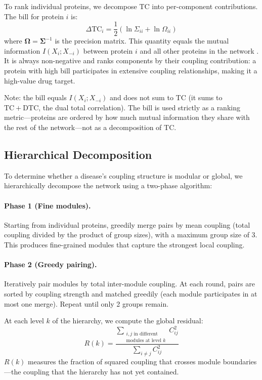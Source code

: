 \documentclass[11pt,a4paper]{article}
\begin{document}
To rank individual proteins, we decompose TC into per-component contributions. The bill for protein $i$ is:
\begin{equation}
\Delta\mathrm{TC}_i = \frac{1}{2}\left(\ln \Sigma_{ii} + \ln \Omega_{ii}\right)
\label{eq:bill}
\end{equation}
where $\boldsymbol{\Omega} = \boldsymbol{\Sigma}^{-1}$ is the precision matrix. This quantity equals the mutual information $I(X_i; X_{-i})$ between protein $i$ and all other proteins in the network \citep{cover2006}. It is always non-negative and ranks components by their coupling contribution: a protein with high bill participates in extensive coupling relationships, making it a high-value drug target.

Note: the bill equals $I(X_i; X_{-i})$ and does not sum to TC (it sums to $\mathrm{TC} + \mathrm{DTC}$, the dual total correlation). The bill is used strictly as a ranking metric---proteins are ordered by how much mutual information they share with the rest of the network---not as a decomposition of TC.

\subsection{Hierarchical Decomposition}

To determine whether a disease's coupling structure is modular or global, we hierarchically decompose the network using a two-phase algorithm:

\paragraph{Phase 1 (Fine modules).} Starting from individual proteins, greedily merge pairs by mean coupling (total coupling divided by the product of group sizes), with a maximum group size of 3. This produces fine-grained modules that capture the strongest local coupling.

\paragraph{Phase 2 (Greedy pairing).} Iteratively pair modules by total inter-module coupling. At each round, pairs are sorted by coupling strength and matched greedily (each module participates in at most one merge). Repeat until only 2 groups remain.

At each level $k$ of the hierarchy, we compute the global residual:
\begin{equation}
R(k) = \frac{\displaystyle\sum_{\substack{i,j \text{ in different} \\ \text{modules at level } k}} C_{ij}^2}{\displaystyle\sum_{i \neq j} C_{ij}^2}
\label{eq:residual}
\end{equation}
$R(k)$ measures the fraction of squared coupling that crosses module boundaries---the coupling that the hierarchy has not yet contained.
\end{document}
